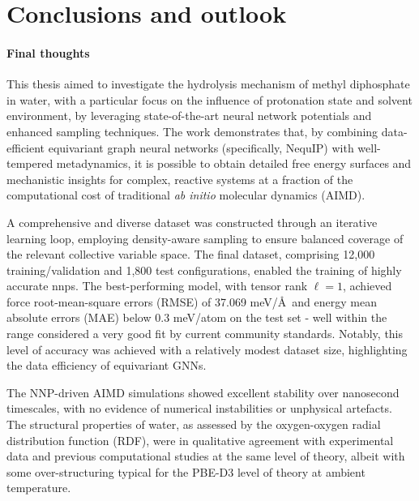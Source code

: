\chapter{Conclusions and outlook}

\subsubsection{Final thoughts}
This thesis aimed to investigate the hydrolysis mechanism of methyl diphosphate in water, with a particular focus on the influence of protonation state and solvent environment, by leveraging state-of-the-art neural network potentials and enhanced sampling techniques. The work demonstrates that, by combining data-efficient equivariant graph neural networks (specifically, NequIP) with well-tempered metadynamics, it is possible to obtain detailed free energy surfaces and mechanistic insights for complex, reactive systems at a fraction of the computational cost of traditional \textit{ab initio} molecular dynamics (AIMD).

A comprehensive and diverse dataset was constructed through an iterative learning loop, employing density-aware sampling to ensure balanced coverage of the relevant collective variable space. The final dataset, comprising 12,000 training/validation and 1,800 test configurations, enabled the training of highly accurate \acp{nnp}. The best-performing model, with tensor rank $\ell=1$, achieved force root-mean-square errors (RMSE) of 37.069 meV/\AA\ and energy mean absolute errors (MAE) below 0.3 meV/atom on the test set - well within the range considered a very good fit by current community standards. Notably, this level of accuracy was achieved with a relatively modest dataset size, highlighting the data efficiency of equivariant GNNs.

The NNP-driven AIMD simulations showed excellent stability over nanosecond \; timescales, with no evidence of numerical instabilities or unphysical artefacts. The structural properties of water, as assessed by the oxygen-oxygen radial distribution function (RDF), were in qualitative agreement with experimental data and previous computational studies at the same level of theory, albeit with some over-structuring typical for the PBE-D3 level of theory at ambient temperature.

